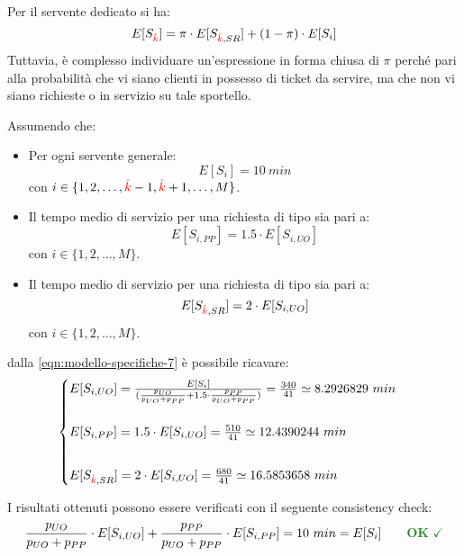Per il servente dedicato si ha:
\begin{equation}
E[S_{\color{red}\hat{k}}] = \pi \cdot E[S_{{\color{red}\hat{k}}, SR}] + (1-\pi) \cdot E[S_i]
\end{equation}
Tuttavia, è complesso individuare un'espressione in forma chiusa di $\pi$ perché pari alla probabilità che vi siano clienti in possesso di ticket \sr{} da servire, ma che non vi siano richieste \uo{} o \pp{} in servizio su tale sportello.

\newpage

Assumendo che:
\begin{itemize}
\item Per ogni servente generale:
\begin{equation}
E[S_i] = 10\ min
\end{equation}
con $i \in \lbrace 1, 2, \dots, {\color{red}\hat{k}}-1, {\color{red}\hat{k}}+1, \dots, M\rbrace$.
\item Il tempo medio di servizio per una richiesta di tipo \pp{} sia pari a:
\begin{equation}
E[S_{i, PP}] = 1.5 \cdot E[S_{i, UO}]
\end{equation}
con $i \in \lbrace 1, 2, \dots, M\rbrace$.
\item Il tempo medio di servizio per una richiesta di tipo \sr{} sia pari a:
\begin{equation}
E[S_{{\color{red}\hat{k}}, SR}] = 2 \cdot E[S_{i, UO}]
\end{equation}
con $i \in \lbrace 1, 2, \dots, M\rbrace$.
\end{itemize}
dalla \ref{eqn:modello-specifiche-7} è possibile ricavare:
\begin{equation}
\begin{cases}
E[S_{i,UO}] = \frac{E[S_i]}{(\frac{p_{UO}}{p_{UO} + p_{PP}} + 1.5\cdot \frac{p_{PP}}{p_{UO} + p_{PP}})} = \frac{340}{41} \simeq 8.2926829\ min \\[2em]
E[S_{i,PP}] = 1.5\cdot E[S_{i,UO}] = \frac{510}{41} \simeq 12.4390244\ min \\[2em]
E[S_{\ded,SR}] = 2 \cdot E[S_{i,UO}] = \frac{680}{41} \simeq 16.5853658\ min
\end{cases}
\end{equation}

I risultati ottenuti possono essere verificati con il seguente consistency check:
\begin{equation}
\frac{p_{UO}}{p_{UO} + p_{PP}} \cdot E[S_{i, UO}] +  \frac{p_{PP}}{p_{UO} + p_{PP}} \cdot E[S_{i, PP}] = 10\ min = E[S_i]\qquad \text{\color{forestgreen}\textbf{OK} \checkmark}
\end{equation}


